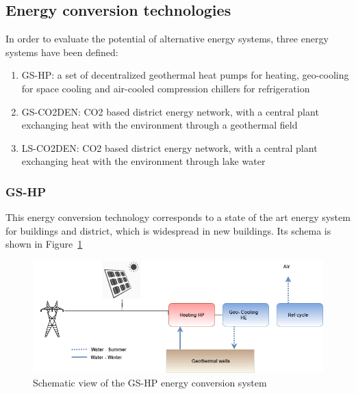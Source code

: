 \documentclass{article}
\begin{document}


\subsection{Energy conversion technologies}

In order to evaluate the potential of alternative energy systems, three energy systems have been defined:
\begin{enumerate}
	\item GS-HP: a set of decentralized geothermal heat pumps for heating, geo-cooling for space cooling and air-cooled compression chillers for refrigeration
	\item GS-CO2DEN: CO2 based district energy network, with a central plant exchanging heat with the environment through a geothermal field
	\item LS-CO2DEN: CO2 based district energy network, with a central plant exchanging heat with the environment through lake water
\end{enumerate}

\subsubsection{GS-HP}
This energy conversion technology corresponds to a state of the art energy system for buildings and district, which is widespread in new buildings. Its schema is shown in Figure~\ref{fig:energyschemaref}

\begin{figure}[tph]
	\centering
	\includegraphics[width=1\linewidth]{Images/energy_schema_ref}
	\caption{Schematic view of the GS-HP energy conversion system}
	\label{fig:energyschemaref}
\end{figure}
\end{document}
